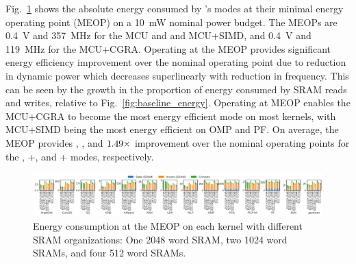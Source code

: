 Fig.~\ref{fig:high_power_energy_banking} shows the absolute energy consumed by
\arch{}'s modes at their minimal energy operating point (MEOP) on a
\SI{10}{\milli\watt} nominal power budget.  The MEOPs are \SI{0.4}{\volt} and
\SI{357}{\mega\hertz} for the MCU and and MCU+SIMD, and \SI{0.4}{\volt} and
\SI{119}{\mega\hertz} for the MCU+CGRA. Operating at the MEOP provides
significant energy efficiency improvement over the nominal operating point due
to reduction in dynamic power which decreases superlinearly with reduction in
frequency. This can be seen by the growth in the proportion of energy consumed
by SRAM reads and writes, relative to Fig.~\ref{fig:baseline_energy}. Operating
at MEOP enables the MCU+CGRA to become the most energy efficient mode on most
kernels, with MCU+SIMD being the most energy efficient on OMP and PF. On
average, the MEOP provides \MeopImprovementMcu{}, \MeopImprovementVMAcc{}, and
\(1.49{}\times\) improvement over the nominal operating points
for the \mcu{}, \mcu{}+\vmacc{}, and \mcu{}+\cgra{} modes, respectively.

\begin{figure}[tb]
    \centering
    \includegraphics[width=1.0\linewidth]{./figs/high_power_energy_banking.png}
    \caption{\small
        Energy consumption at the MEOP on each kernel with different SRAM
        organizations: One 2048 word SRAM, two 1024 word SRAMs, and four 512
        word SRAMs.
    }
    \label{fig:high_power_energy_banking}
\end{figure}

% 

